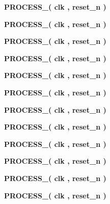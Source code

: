 \begin{DoxyCompactItemize}
\item 
{\bf P\+R\+O\+C\+E\+S\+S\+\_}{\bfseries  ( {\bfseries {\bfseries {\bf clk}} \textcolor{vhdlchar}{ }} , {\bfseries {\bfseries {\bf reset\+\_\+n}} \textcolor{vhdlchar}{ }} )}
\item 
{\bf P\+R\+O\+C\+E\+S\+S\+\_}{\bfseries  ( {\bfseries {\bfseries {\bf clk}} \textcolor{vhdlchar}{ }} , {\bfseries {\bfseries {\bf reset\+\_\+n}} \textcolor{vhdlchar}{ }} )}
\item 
{\bf P\+R\+O\+C\+E\+S\+S\+\_}{\bfseries  ( {\bfseries {\bfseries {\bf clk}} \textcolor{vhdlchar}{ }} , {\bfseries {\bfseries {\bf reset\+\_\+n}} \textcolor{vhdlchar}{ }} )}
\item 
{\bf P\+R\+O\+C\+E\+S\+S\+\_}{\bfseries  ( {\bfseries {\bfseries {\bf clk}} \textcolor{vhdlchar}{ }} , {\bfseries {\bfseries {\bf reset\+\_\+n}} \textcolor{vhdlchar}{ }} )}
\item 
{\bf P\+R\+O\+C\+E\+S\+S\+\_}{\bfseries  ( {\bfseries {\bfseries {\bf clk}} \textcolor{vhdlchar}{ }} , {\bfseries {\bfseries {\bf reset\+\_\+n}} \textcolor{vhdlchar}{ }} )}
\item 
{\bf P\+R\+O\+C\+E\+S\+S\+\_}{\bfseries  ( {\bfseries {\bfseries {\bf clk}} \textcolor{vhdlchar}{ }} , {\bfseries {\bfseries {\bf reset\+\_\+n}} \textcolor{vhdlchar}{ }} )}
\item 
{\bf P\+R\+O\+C\+E\+S\+S\+\_}{\bfseries  ( {\bfseries {\bfseries {\bf clk}} \textcolor{vhdlchar}{ }} , {\bfseries {\bfseries {\bf reset\+\_\+n}} \textcolor{vhdlchar}{ }} )}
\item 
{\bf P\+R\+O\+C\+E\+S\+S\+\_}{\bfseries  ( {\bfseries {\bfseries {\bf clk}} \textcolor{vhdlchar}{ }} , {\bfseries {\bfseries {\bf reset\+\_\+n}} \textcolor{vhdlchar}{ }} )}
\item 
{\bf P\+R\+O\+C\+E\+S\+S\+\_}{\bfseries  ( {\bfseries {\bfseries {\bf clk}} \textcolor{vhdlchar}{ }} , {\bfseries {\bfseries {\bf reset\+\_\+n}} \textcolor{vhdlchar}{ }} )}
\item 
{\bf P\+R\+O\+C\+E\+S\+S\+\_}{\bfseries  ( {\bfseries {\bfseries {\bf clk}} \textcolor{vhdlchar}{ }} , {\bfseries {\bfseries {\bf reset\+\_\+n}} \textcolor{vhdlchar}{ }} )}
\item 
{\bf P\+R\+O\+C\+E\+S\+S\+\_}{\bfseries  ( {\bfseries {\bfseries {\bf clk}} \textcolor{vhdlchar}{ }} , {\bfseries {\bfseries {\bf reset\+\_\+n}} \textcolor{vhdlchar}{ }} )}
\item 
{\bf P\+R\+O\+C\+E\+S\+S\+\_}{\bfseries  ( {\bfseries {\bfseries {\bf clk}} \textcolor{vhdlchar}{ }} , {\bfseries {\bfseries {\bf reset\+\_\+n}} \textcolor{vhdlchar}{ }} )}

\end{DoxyCompactItemize}
